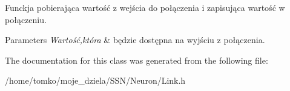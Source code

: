 \-Funckja pobierająca wartość z wejścia do połączenia i zapisująca wartość w połączeniu. 
\begin{DoxyParams}{\-Parameters}
{\em \-Wartość,która} & będzie dostępna na wyjściu z połączenia. \\
\hline
\end{DoxyParams}


\-The documentation for this class was generated from the following file\-:\begin{DoxyCompactItemize}
\item 
/home/tomko/moje\-\_\-dziela/\-S\-S\-N/\-Neuron/\-Link.\-h\end{DoxyCompactItemize}
